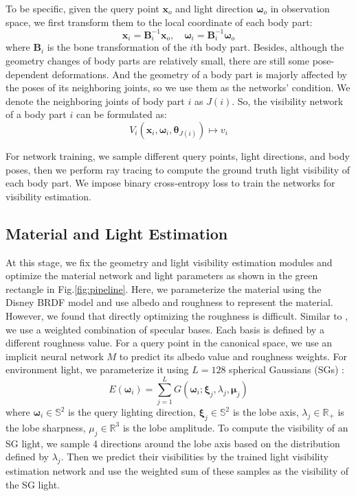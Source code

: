 To be specific, given the query point $\mathbf{x}_o$ and light direction $\mathbf{\omega}_o$ in observation space, we first transform them to the local coordinate of each body part:
\begin{equation}
    \mathbf{x}_i = \mathbf{B}_i^{-1} \mathbf{x}_o, \quad \mathbf{\omega}_i = \mathbf{B}_i^{-1} \mathbf{\omega}_o
\end{equation}
where $\mathbf{B}_i$ is the bone transformation of the $i$th body part.
Besides, although the geometry changes of body parts are relatively small, there are still some pose-dependent deformations. 
And the geometry of a body part is majorly affected by the poses of its neighboring joints, so we use them as the networks' condition.
We denote the neighboring joints of body part $i$ as $J(i)$.
So, the visibility network of a body part $i$ can be formulated as:
\begin{equation}
    V_i\left(\mathbf{x}_{i}, \mathbf{\omega}_{i}, \mathbf{\theta}_{J(i)}\right) \mapsto v_i
\end{equation}

For network training, we sample different query points, light directions, and body poses, then we perform ray tracing to compute the ground truth light visibility of each body part.
We impose binary cross-entropy loss to train the networks for visibility estimation.


\subsection{Material and Light Estimation}
\label{sec:mat_est}
At this stage, we fix the geometry and light visibility estimation modules and optimize the material network and light parameters as shown in the green rectangle in Fig.\ref{fig:pipeline}.
Here, we parameterize the material using the Disney BRDF \cite{disneyBRDF} model and use albedo and roughness to represent the material.
However, we found that directly optimizing the roughness is difficult.
Similar to \cite{zhuo17, li22, psnerf}, we use a weighted combination of specular bases.
Each basis is defined by a different roughness value.
For a query point in the canonical space, we use an implicit neural network $M$ to predict its albedo value and roughness weights.
For environment light, we parameterize it using $L=128$ spherical Gaussians (SGs) \cite{SG}:
\begin{equation}
    E\left(\mathbf{\omega}_{i}\right)=\sum_{j=1}^L G\left(\mathbf{\omega}_{i} ; \mathbf{\xi}_j, \lambda_j, \mathbf{\mu}_j\right)
\end{equation}
where $\mathbf{\omega}_i\in \mathbb{S}^2$ is the query lighting direction, $\mathbf{\xi}_j\in \mathbb{S}^2$ is the lobe axis, $\lambda_j \in \mathbb{R}_{+}$ is the lobe sharpness, $\mu_j \in \mathbb{R}^3$ is the lobe amplitude. 
To compute the visibility of an SG light, we sample 4 directions around the lobe axis based on the distribution defined by $\lambda_j$. 
Then we predict their visibilities by the trained light visibility estimation network and use the weighted sum of these samples as the visibility of the SG light.

